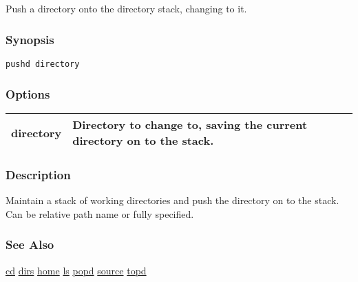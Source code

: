 \subsection{}
\label{pushd}
Push a directory onto the directory stack, changing to it. 
\subsubsection*{Synopsis}
\begin{verbatim}
pushd directory
\end{verbatim}
\subsubsection*{Options}
\begin{tabular}{|l|l|}
\hline 
 directory  & Directory to change to, saving the current directory on to the stack.  \\
 \hline 
\end{tabular}
\subsubsection*{Description}
 Maintain a stack of working directories and push the directory on to the stack. Can be relative path name or fully specified. 
\subsubsection*{See Also}
\hyperref[cd]{cd} \hyperref[dirs]{dirs} \hyperref[home]{home} \hyperref[ls]{ls} \hyperref[popd]{popd} \hyperref[source]{source} \hyperref[topd]{topd} 